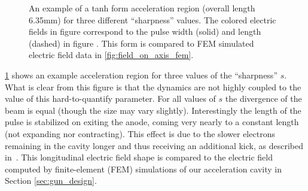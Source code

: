 \begin{figure}
  \centerline{
    \subfloat[][]{
      \label{fig:field_on_axis}
      \begin{tikzpicture}
        
      \end{tikzpicture}
    }
    \subfloat[][]{
      \label{fig:tanh_sharpness}
      
    }
  }
  \caption[An example of a tanh form acceleration region for three different ``sharpness'' values]{
    An example of a tanh form acceleration region (overall length 6.35mm) for three different ``sharpness'' values.
    The colored electric fields in figure \protect{} correspond to the pulse width (solid) and length (dashed) in figure \protect{}.
    This form is compared to FEM simulated electric field data in \ref{fig:field_on_axis_fem}.
  }
  \label{fig:gun-sharpness}
\end{figure}

\ref{fig:gun-sharpness} shows an example acceleration region for three values of the ``sharpness'' $s$.
What is clear from this figure is that the dynamics are not highly coupled to the value of this hard-to-quantify parameter.
For all values of $s$ the divergence of the beam is equal (though the size may vary slightly).
Interestingly the length of the pulse is stabilized on exiting the anode, coming very nearly to a constant length (not expanding nor contracting).
This effect is due to the slower electrons remaining in the cavity longer and thus receiving an additional kick, as described in~\cite{oudheusden_electron_2007}.
This longitudinal electric field shape is compared to the electric field computed by finite-element (FEM) simulations of our acceleration cavity in Section \ref{sec:gun_design}.


